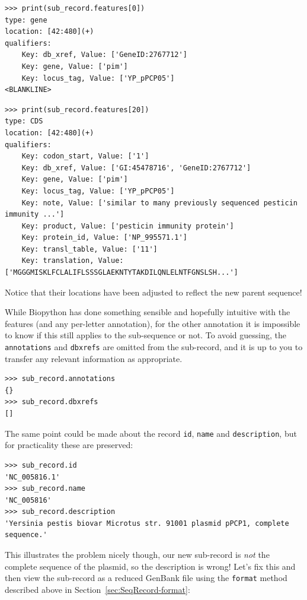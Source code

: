 \documentclass{report}
\begin{document}
\begin{verbatim}
>>> print(sub_record.features[0])
type: gene
location: [42:480](+)
qualifiers:
    Key: db_xref, Value: ['GeneID:2767712']
    Key: gene, Value: ['pim']
    Key: locus_tag, Value: ['YP_pPCP05']
<BLANKLINE>
\end{verbatim}
\begin{verbatim}
>>> print(sub_record.features[20])
type: CDS
location: [42:480](+)
qualifiers:
    Key: codon_start, Value: ['1']
    Key: db_xref, Value: ['GI:45478716', 'GeneID:2767712']
    Key: gene, Value: ['pim']
    Key: locus_tag, Value: ['YP_pPCP05']
    Key: note, Value: ['similar to many previously sequenced pesticin immunity ...']
    Key: product, Value: ['pesticin immunity protein']
    Key: protein_id, Value: ['NP_995571.1']
    Key: transl_table, Value: ['11']
    Key: translation, Value: ['MGGGMISKLFCLALIFLSSSGLAEKNTYTAKDILQNLELNTFGNSLSH...']
\end{verbatim}

\noindent Notice that their locations have been adjusted to reflect the new parent sequence!

While Biopython has done something sensible and hopefully intuitive with the features
(and any per-letter annotation), for the other annotation it is impossible to know if
this still applies to the sub-sequence or not. To avoid guessing, the \texttt{annotations}
and \texttt{dbxrefs} are omitted from the sub-record, and it is up to you to transfer
any relevant information as appropriate.

\begin{verbatim}
>>> sub_record.annotations
{}
>>> sub_record.dbxrefs
[]
\end{verbatim}

The same point could be made about the record \texttt{id}, \texttt{name}
and \texttt{description}, but for practicality these are preserved:

\begin{verbatim}
>>> sub_record.id
'NC_005816.1'
>>> sub_record.name
'NC_005816'
>>> sub_record.description
'Yersinia pestis biovar Microtus str. 91001 plasmid pPCP1, complete sequence.'
\end{verbatim}

\noindent This illustrates the problem nicely though, our new sub-record is
\emph{not} the complete sequence of the plasmid, so the description is wrong!
Let's fix this and then view the sub-record as a reduced GenBank file using
the \texttt{format} method described above in Section~\ref{sec:SeqRecord-format}:
\end{document}

